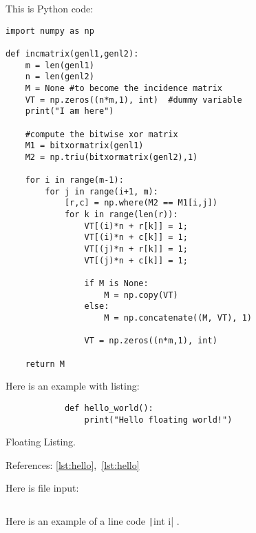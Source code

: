\documentclass{article}
\begin{document}
    This is Python code:
\begin{verbatim}
import numpy as np

def incmatrix(genl1,genl2):
    m = len(genl1)
    n = len(genl2)
    M = None #to become the incidence matrix
    VT = np.zeros((n*m,1), int)  #dummy variable
    print("I am here")

    #compute the bitwise xor matrix
    M1 = bitxormatrix(genl1)
    M2 = np.triu(bitxormatrix(genl2),1)

    for i in range(m-1):
        for j in range(i+1, m):
            [r,c] = np.where(M2 == M1[i,j])
            for k in range(len(r)):
                VT[(i)*n + r[k]] = 1;
                VT[(i)*n + c[k]] = 1;
                VT[(j)*n + r[k]] = 1;
                VT[(j)*n + c[k]] = 1;

                if M is None:
                    M = np.copy(VT)
                else:
                    M = np.concatenate((M, VT), 1)

                VT = np.zeros((n*m,1), int)

    return M
\end{verbatim}

    Here is an example with listing:
    \begin{listing}
        \begin{verbatim}
            def hello_world():
                print("Hello floating world!")
        \end{verbatim}
        \caption{Floating Listing.}
        \label{lst:hello}
    \end{listing}

    References: \cref{lst:hello},~\ref{lst:hello}

    Here is file input:
    \inputminted{tex}{source_code_test.tex}

    Here is an example of a line code \texttt|int i| .
\end{document}
